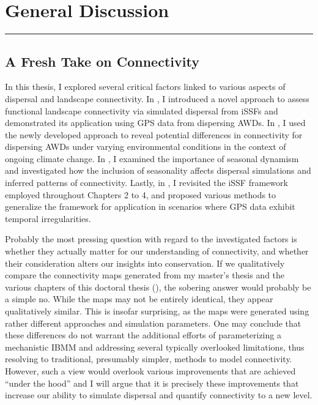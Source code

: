 \documentclass[../FinalThesis.tex]{subfiles}
\begin{document}
\chapter{General Discussion}
\label{GeneralDiscussion}
\thispagestyle{empty}
\vspace{-1cm}
\noindent\hfil\rule{0.75\textwidth}{.4pt}\hfil

\newpage

\section{A Fresh Take on Connectivity}

In this thesis, I explored several critical factors linked to various aspects of
dispersal and landscape connectivity. In , I introduced
a novel approach to assess functional landscape connectivity via simulated
dispersal from iSSFs and demonstrated its application using GPS data from
dispersing AWDs. In , I used the newly developed approach to
reveal potential differences in connectivity for dispersing AWDs under varying
environmental conditions in the context of ongoing climate change. In
, I examined the importance of seasonal dynamism and
investigated how the inclusion of seasonality affects dispersal simulations and
inferred patterns of connectivity. Lastly, in , I
revisited the iSSF framework employed throughout Chapters 2 to 4, and proposed
various methods to generalize the framework for application in scenarios where
GPS data exhibit temporal irregularities.

Probably the most pressing question with regard to the investigated factors is
whether they actually matter for our understanding of connectivity, and whether
their consideration alters our insights into conservation. If we qualitatively
compare the connectivity maps generated from my master's thesis
\citep{Hofmann.2021} and the various chapters of this doctoral thesis
(), the sobering answer would probably be a simple
no. While the maps may not be entirely identical, they appear qualitatively
similar. This is insofar surprising, as the maps were generated using rather
different approaches and simulation parameters. One may conclude that these
differences do not warrant the additional efforts of parameterizing a
mechanistic IBMM and addressing several typically overlooked limitations, thus
resolving to traditional, presumably simpler, methods to model connectivity.
However, such a view would overlook various improvements that are achieved
``under the hood'' and I will argue that it is precisely these improvements that
increase our ability to simulate dispersal and quantify connectivity to a new
level.
\end{document}
